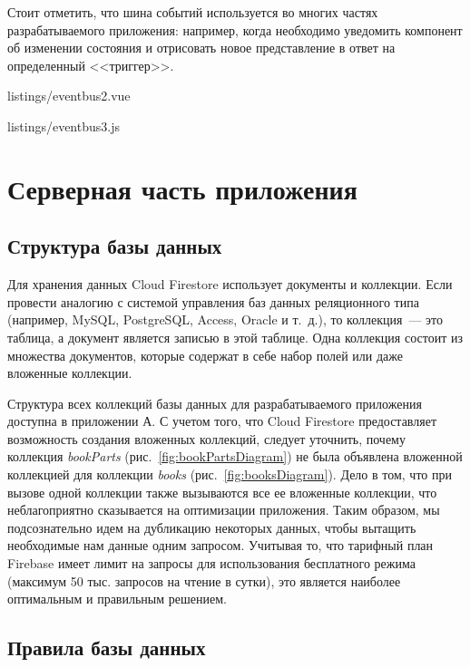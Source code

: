 Стоит отметить, что шина событий используется во многих частях разрабатываемого приложения: например, когда необходимо уведомить компонент об изменении состояния и отрисовать новое представление в ответ на определенный <<триггер>>.

\clearpage


{listings/eventbus2.vue}


{listings/eventbus3.js}

\section{Серверная часть приложения}

\subsection{Структура базы данных}

Для хранения данных Cloud Firestore использует документы и коллекции. Если провести аналогию с системой управления баз данных реляционного типа (например, MySQL, PostgreSQL, Access, Oracle и т.~д.), то коллекция~--- это таблица, а документ является записью в этой таблице. Одна коллекция состоит из множества документов, которые содержат в себе набор полей или даже вложенные коллекции.

Структура всех коллекций базы данных для разрабатываемого приложения доступна в приложении А. С учетом того, что Cloud Firestore предоставляет возможность создания вложенных коллекций, следует уточнить, почему коллекция \textit{bookParts} (рис.~\ref{fig:bookPartsDiagram}) не была объявлена вложенной коллекцией для коллекции \textit{books} (рис.~\ref{fig:booksDiagram}). Дело в том, что при вызове одной коллекции также вызываются все ее вложенные коллекции, что неблагоприятно сказывается на оптимизации приложения. Таким образом, мы подсознательно идем на дубликацию некоторых данных, чтобы вытащить необходимые нам данные одним запросом. Учитывая то, что тарифный план Firebase имеет лимит на запросы для использования бесплатного режима (максимум 50 тыс. запросов на чтение в сутки), это является наиболее оптимальным и правильным решением.

\subsection{Правила базы данных}

